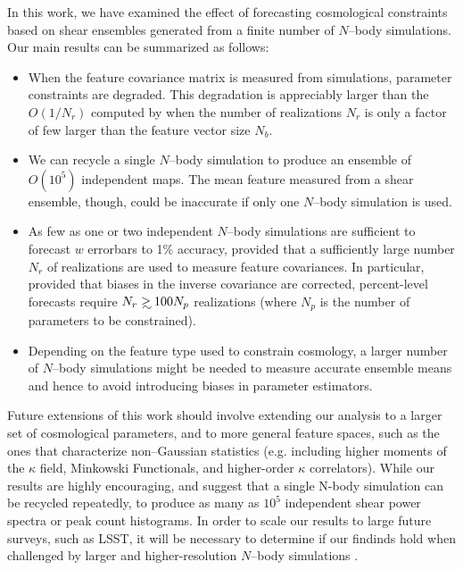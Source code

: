 \documentclass[reprint,aps,prd,superscriptaddress,showkeys,showpacs]{revtex4-1}
\newcommand\gsim{\mathrel{\rlap{\lower4pt\hbox{\hskip1pt$\sim$}}
        \raise1pt\hbox{$>$}}}
\begin{document}
In this work, we have examined the effect of forecasting cosmological
constraints based on shear ensembles generated from a finite number of
$N$--body simulations.  Our main results can be summarized as follows:
\vspace{0.4\baselineskip}
\begin{itemize}

\item When the feature covariance matrix is measured from simulations,
  parameter constraints are degraded. This degradation is appreciably
  larger than the $O(1/N_r)$ computed by \citep{DodelsonSchneider13}
  when the number of realizations $N_r$ is only a factor of few larger
  than the feature vector size $N_b$.
\item We can recycle a single $N$--body simulation to produce an
  ensemble of $O(10^5)$ independent maps. The mean feature measured
  from a shear ensemble, though, could be inaccurate if only one
  $N$--body simulation is used.
\item As few as one or two independent $N$--body simulations are
  sufficient to forecast $w$ errorbars to 1\% accuracy, provided that
  a sufficiently large number $N_r$ of realizations are used to
  measure feature covariances.  In particular, provided that biases
  in the inverse covariance are corrected, percent-level forecasts
  require $N_r\gsim 100 N_p$ realizations (where $N_p$ is the number
  of parameters to be constrained).
\item Depending on the feature type used to constrain cosmology, a
  larger number of $N$--body simulations might be needed to measure
  accurate ensemble means and hence to avoid introducing biases in
  parameter estimators.
\end{itemize}
%
Future extensions of this work should involve extending our analysis
to a larger set of cosmological parameters, and to more general
feature spaces, such as the ones that characterize non--Gaussian
statistics (e.g. including higher moments of the $\kappa$ field,
Minkowski Functionals, and higher-order $\kappa$ correlators). While
our results are highly encouraging, and suggest that a single N-body
simulation can be recycled repeatedly, to produce as many as $10^5$
independent shear power spectra or peak count histograms. In order to
scale our results to large future surveys, such as LSST, it will be
necessary to determine if our findinds hold when challenged by larger
and higher-resolution $N$--body simulations \citep{Qcontinuum}.
\end{document}
